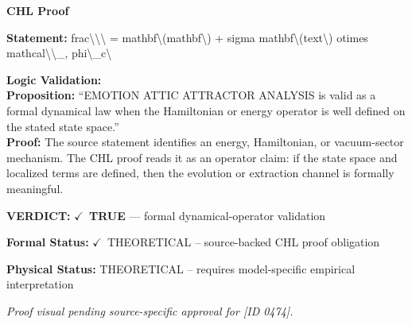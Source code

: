 \vspace{0.45em}
\noindent\textbf{CHL Proof}\par
\textbf{Statement:} frac\textbackslash{}\textbackslash{}\textbackslash{} = mathbf\textbackslash{}(mathbf\textbackslash{}) + sigma mathbf\textbackslash{}(text\textbackslash{}) otimes mathcal\textbackslash{}\textbackslash{}\_, phi\textbackslash{}\_c\textbackslash{}

\textbf{Logic Validation:}\\
\textbf{Proposition:} ``EMOTION ATTIC ATTRACTOR ANALYSIS is valid as a formal dynamical law when the Hamiltonian
or energy operator is well defined on the stated state space.''\\
\textbf{Proof:} The source statement identifies an energy, Hamiltonian, or vacuum-sector mechanism. The
CHL proof reads it as an operator claim: if the state space and localized terms are
defined, then the evolution or extraction channel is formally meaningful.

\textbf{VERDICT:} \ensuremath{\checkmark}\ \textbf{TRUE} --- formal dynamical-operator validation

\textbf{Formal Status:} \ensuremath{\checkmark}\ THEORETICAL -- source-backed CHL proof obligation

\textbf{Physical Status:} THEORETICAL -- requires model-specific empirical interpretation
\par\vspace{0.45em}
\par
\vfill
\begingroup\footnotesize\itshape
Proof visual pending source-specific approval for [ID 0474].
\par\endgroup
\vfill
\endgroup
\endgroup
